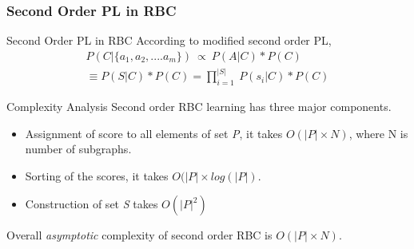 \documentclass[10pt, blue,subsection=true, compress]{beamer}
\begin{document}
\begin{frame}\frametitle{Second Order PL in RBC}
\begin{block}{Second Order PL in RBC}
According to modified second order PL,  
\begin{align}
\nonumber
 P(C | \{a_1,a_2,....a_m\}) ~ \propto ~ P(A | C)*P(C) \\
\equiv P(S | C)*P(C)=  \prod_{i=1}^{|S|} ~ P(s_i | C)*P(C)
\end{align}
\end{block}
\begin{block}{Complexity Analysis}
Second order RBC learning has three major components. 
\begin{itemize}
 \item Assignment of score to all elements of set \textit{P}, it takes $O(|P|\times N)$, where N is number of subgraphs.
\item Sorting of the scores, it takes $O(|P| \times log(|P|)$. 
\item Construction of set \textit{S} takes $O(|P|^2)$
\end{itemize}
Overall \emph{asymptotic} complexity of second order RBC is $O(|P|\times N)$.
\end{block}
\end{frame}

\end{document}

